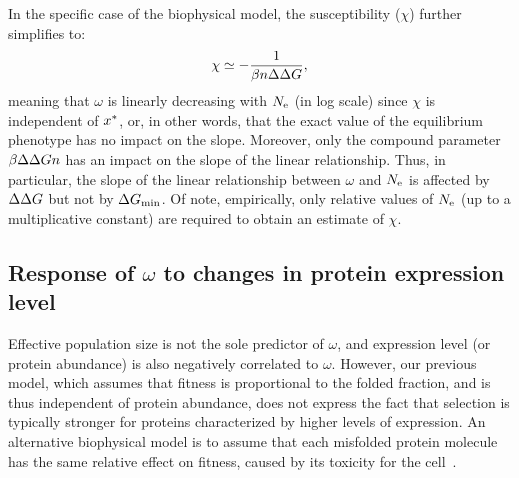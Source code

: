 In the specific case of the biophysical model, the susceptibility ($\chi$) further simplifies to:
\begin{gather}
    \chi \simeq -\dfrac{1}{\beta \NbrSites \EmpiricalDeltaDeltaG}, \label{eq:chi_application}
\end{gather}
meaning that $\omega$ is linearly decreasing with $N_{\text{e}}$ (in log scale) since $\chi$ is independent of $x^{*}$, or, in other words, that the exact value of the equilibrium {phenotype} has no impact on the slope.
Moreover, only the compound parameter $\beta \Delta \Delta G n$ has an impact on the slope of the linear relationship.
Thus, in particular, the slope of the linear relationship between $\omega$ and $N_{\text{e}}$ is affected by $\Delta \Delta G$ but not by $\Delta G_{\text{min}}$.
Of note, empirically, only relative values of $N_{\text{e}}$ (up to a multiplicative constant) are required to obtain an estimate of $\chi$.

\subsection{Response of $\omega$ to changes in protein expression level}
\label{sec:expression}

Effective population size is not the sole predictor of $\omega$, and expression level (or protein abundance) is also negatively correlated to $\omega$.
However, our previous model, which assumes that fitness is proportional to the folded fraction, and is thus independent of protein abundance, does not express the fact that selection is typically stronger for proteins characterized by higher levels of expression.
An alternative biophysical model is to assume that each misfolded protein molecule has the same relative effect on fitness, caused by its toxicity for the cell~\citep{Drummond2005a, Wilke2006, Drummond2008, Serohijos2012}.

